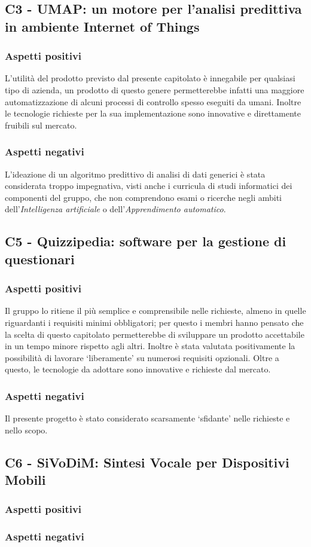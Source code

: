 \subsection{C3 - UMAP: un motore per l'analisi predittiva in ambiente Internet of Things}
\subsubsection{Aspetti positivi}
L'utilit\`a del prodotto previsto dal presente capitolato \`e innegabile per qualsiasi tipo di azienda,
un prodotto di questo genere permetterebbe infatti una maggiore automatizzazione di alcuni
processi di controllo spesso eseguiti da umani.
Inoltre le tecnologie richieste per la sua implementazione sono innovative e direttamente fruibili sul mercato.

\subsubsection{Aspetti negativi}
L'ideazione di un algoritmo predittivo di analisi di dati generici è stata considerata troppo impegnativa,
visti anche i curricula di studi informatici dei componenti del gruppo, che non comprendono esami
o ricerche negli ambiti dell'\textit{Intelligenza artificiale} o dell'\textit{Apprendimento automatico}.


\subsection{C5 - Quizzipedia: software per la gestione di questionari}
\subsubsection{Aspetti positivi}
Il gruppo lo ritiene il pi\`u semplice e comprensibile nelle richieste, almeno in quelle
riguardanti i requisiti minimi obbligatori; per questo i membri hanno pensato che la scelta 
di questo capitolato permetterebbe di sviluppare un prodotto accettabile in un tempo minore
rispetto agli altri. 
Inoltre \`e stata valutata positivamente la possibilit\`a di lavorare `liberamente'
su numerosi requisiti opzionali. 
Oltre a questo, le tecnologie da adottare sono innovative e richieste dal mercato.
\subsubsection{Aspetti negativi}
Il presente progetto \`e stato considerato scarsamente `sfidante' nelle richieste e nello scopo.

\subsection{C6 - SiVoDiM: Sintesi Vocale per Dispositivi Mobili}
\subsubsection{Aspetti positivi}
\subsubsection{Aspetti negativi}


